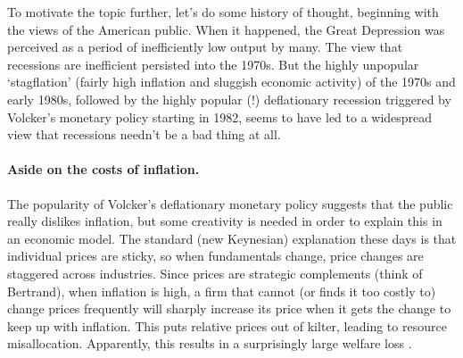 \documentclass[11pt,letterpaper,reqno,oneside]{article}
\begin{document}
To motivate the topic further, let's do some history of thought, beginning with the views of the American public. When it happened, the Great Depression was perceived as a period of inefficiently low output by many. The view that recessions are inefficient persisted into the 1970s. But the highly unpopular `stagflation' (fairly high inflation and sluggish economic activity) of the 1970s and early 1980s, followed by the highly popular (!) deflationary recession triggered by Volcker's monetary policy starting in 1982, seems to have led to a widespread view that recessions needn't be a bad thing at all.

\paragraph{Aside on the costs of inflation.} The popularity of Volcker's deflationary monetary policy suggests that the public really dislikes inflation, but some creativity is needed in order to explain this in an economic model. The standard (new Keynesian) explanation these days is that individual prices are sticky, so when fundamentals change, price changes are staggered across industries. Since prices are strategic complements (think of Bertrand), when inflation is high, a firm that cannot (or finds it too costly to) change prices frequently will sharply increase its price when it gets the change to keep up with inflation. This puts relative prices out of kilter, leading to resource misallocation. Apparently, this results in a surprisingly large welfare loss \parencite{Christiano2015}.
\end{document}
